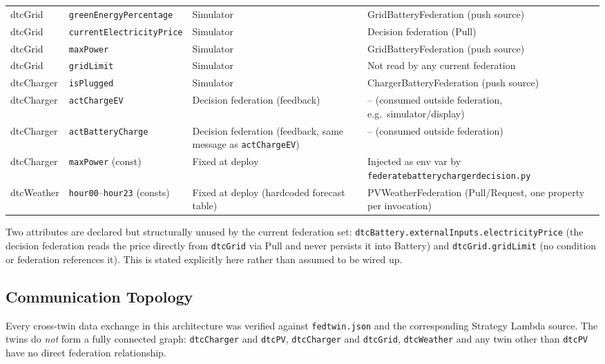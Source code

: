 \documentclass[11pt]{article}
\renewcommand{\_}{\textunderscore\allowbreak}
\begin{document}
\begin{center}
\begin{tabularx}{\textwidth}{
  @{}>{\raggedright\arraybackslash}p{1.6cm}
  >{\raggedright\arraybackslash}p{2.5cm}
  >{\raggedright\arraybackslash}X
  >{\raggedright\arraybackslash}X@{}
}
\midrule
dtcGrid & \texttt{greenEnergyPercentage} & Simulator & GridBatteryFederation (push source) \\
dtcGrid & \texttt{currentElectricityPrice} & Simulator & Decision federation (Pull) \\
dtcGrid & \texttt{maxPower} & Simulator & GridBatteryFederation (push source) \\
dtcGrid & \texttt{gridLimit} & Simulator & Not read by any current federation \\
\midrule
dtcCharger & \texttt{isPlugged} & Simulator & ChargerBatteryFederation (push source) \\
dtcCharger & \texttt{actChargeEV} & Decision federation (feedback) & -- (consumed outside federation, e.g.\ simulator/display) \\
dtcCharger & \texttt{actBatteryCharge} & Decision federation (feedback, same message as \texttt{actChargeEV}) & -- (consumed outside federation) \\
dtcCharger & \texttt{maxPower} (const) & Fixed at deploy & Injected as env var by \texttt{federate\_battery\_charger\_decision.py} \\
\midrule
dtcWeather & \texttt{hour00}--\texttt{hour23} (consts) & Fixed at deploy (hardcoded forecast table) & PVWeatherFederation (Pull/Request, one property per invocation) \\
\bottomrule
\end{tabularx}
\end{center}

Two attributes are declared but structurally unused by the current
federation set: \texttt{dtcBattery.externalInputs.electricityPrice} (the
decision federation reads the price directly from \texttt{dtcGrid} via Pull
and never persists it into Battery) and \texttt{dtcGrid.gridLimit} (no
condition or federation references it). This is stated explicitly here
rather than assumed to be wired up.

\subsection{Communication Topology}

Every cross-twin data exchange in this architecture was verified against
\texttt{fedtwin.json} and the corresponding Strategy Lambda source. The twins
do \emph{not} form a fully connected graph: \texttt{dtcCharger} and
\texttt{dtcPV}, \texttt{dtcCharger} and \texttt{dtcGrid},
\texttt{dtcWeather} and any twin other than \texttt{dtcPV} have no direct
federation relationship.
\end{document}
